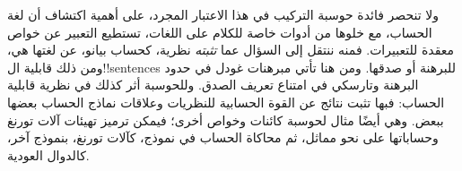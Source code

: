 \documentclass[../../../include/open-logic-section]{subfiles}
\begin{document}
ولا تنحصر فائدة حوسبة التركيب في هذا الاعتبار
المجرد، على أهمية اكتشاف أن لغة الحساب،
مع خلوها من أدوات خاصة للكلام على اللغات،
تستطيع التعبير عن خواص معقدة للتعبيرات.
فمنه ننتقل إلى السؤال عما \emph{تثبته}
نظرية، كحساب بيانو، عن لغتها هي، ومن
ذلك قابلية ال!!{sentence}s للبرهنة أو
صدقها. ومن هنا تأتي مبرهنات غودل في
حدود البرهنة وتارسكي في امتناع تعريف الصدق.
وللحوسبة أثر كذلك في نظرية قابلية الحساب:
فبها تثبت نتائج عن القوة الحسابية للنظريات
وعلاقات نماذج الحساب بعضها ببعض.
وهي أيضًا مثال لحوسبة كائنات وخواص أخرى؛
فيمكن ترميز تهيئات آلات تورنغ وحساباتها
على نحو مماثل، ثم محاكاة الحساب في نموذج،
كآلات تورنغ، بنموذج آخر، كالدوال العودية.
\end{document}
